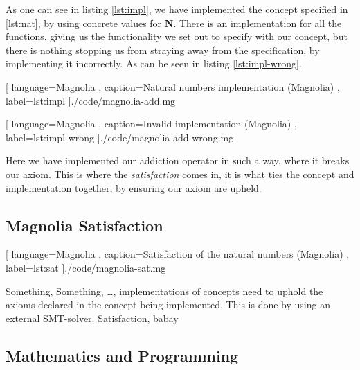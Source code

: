 As one can see in listing \ref{lst:impl}, we have implemented the concept
specified in \ref{lst:nat}, by using concrete values for \textbf{N}. There is an
implementation for all the functions, giving us the functionality we set out to
specify with our concept, but there is nothing stopping us from straying away
from the specification, by implementing it incorrectly. As can be seen in
listing \ref{lst:impl-wrong}.

\begin{center}
  
    [ language=Magnolia
    , caption={Natural numbers implementation (Magnolia)}
    , label=lst:impl
    ]{./code/magnolia-add.mg}
\end{center}

\begin{center}
  
    [ language=Magnolia
    , caption={Invalid implementation (Magnolia)}
    , label=lst:impl-wrong
    ]{./code/magnolia-add-wrong.mg}
\end{center}

Here we have implemented our addiction operator in such a way, where it breaks
our axiom. This is where the \textit{satisfaction} comes in, it is what ties the
concept and implementation together, by ensuring our axiom are upheld.

\subsection{Magnolia Satisfaction}

\begin{center}
  
    [ language=Magnolia
    , caption={Satisfaction of the natural numbers (Magnolia)}
    , label=lst:sat
    ]{./code/magnolia-sat.mg}
\end{center}

Something, Something, \dots, implementations of concepts need to uphold the
axioms declared in the concept being implemented. This is done by using an
external SMT-solver. Satisfaction, babay


\subsection{Mathematics and Programming}

